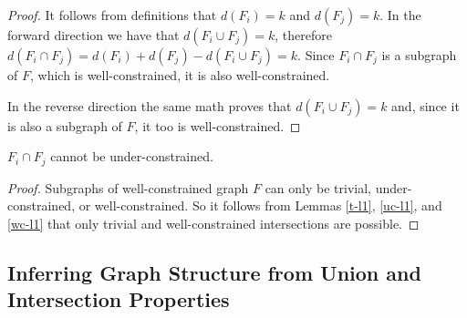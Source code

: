 \documentclass[11pt]{article}
\newcommand{\todo}[1]{\textsc{{\color{red}#1}}}
\begin{document}
\begin{proof}
It follows from definitions that $d(F_i)=k$ and $d(F_j)=k$. In the forward direction we have that $d(F_i\cup F_j)=k$, therefore $d(F_i\cap F_j)=d(F_i)+d(F_j)-d(F_i\cup F_j)=k$. Since $F_i\cap F_j$ is a subgraph of $F$, which is well-constrained, it is also well-constrained.

In the reverse direction the same math proves that $d(F_i\cup F_j)=k$ and, since it is also a subgraph of $F$, it too is well-constrained.



\end{proof}


\begin{lemma}\label{iuc-l1}
$F_i\cap F_j$ cannot be under-constrained.
\end{lemma}

\begin{proof}
Subgraphs of well-constrained graph $F$ can only be trivial, under-constrained, or well-constrained. So it follows from Lemmas \ref{t-l1}, \ref{uc-l1}, and \ref{wc-l1} that only trivial and well-constrained intersections are possible.
\end{proof}






\subsection{Inferring Graph Structure from Union and Intersection Properties}
\end{document}
